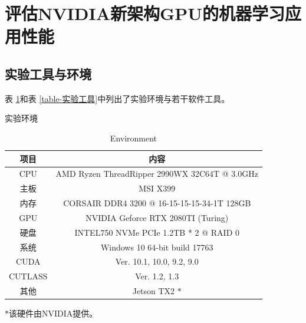 \newpage
\section{评估NVIDIA新架构GPU的机器学习应用性能}
\setcounter{table}{0}
\setcounter{figure}{0}
\subsection{实验工具与环境}
\par 表 \ref{table-环境}和表 \ref{table-实验工具}中列出了实验环境与若干软件工具。\\
\begin{table}
	\centering
	\renewcommand{\thetable}{\arabic{section}-\arabic{table} }
	\renewcommand{\tablename}{表}
	\caption{实验环境}
	\addtocounter{table}{-1}
	\renewcommand{\thetable}{\arabic{section}-\arabic{table} }
	\renewcommand{\tablename}{Table}
	\caption{Environment}
	\begin{tabular}{cc}
		\toprule
		项目	&	内容\\
		\midrule
		CPU		&	AMD Ryzen ThreadRipper 2990WX 32C64T @ 3.0GHz\\
		主板		&	MSI X399\\
		内存		&	CORSAIR DDR4 3200 @ 16-15-15-15-34-1T 128GB\\
		GPU		&	NVIDIA Geforce RTX 2080TI (Turing)\\
		硬盘		&	INTEL750 NVMe PCIe 1.2TB * 2 @ RAID 0\\
		系统		&	Windows 10 64-bit build 17763\\	
		CUDA	&	Ver. 10.1, 10.0, 9.2, 9.0\\
		CUTLASS & Ver. 1.2, 1.3\\
		其他		&	Jetson TX2 $ * $\\
		\bottomrule
	\end{tabular} 
	\label{table-环境}
	
	$ * $该硬件由NVIDIA提供。\\
\end{table}

